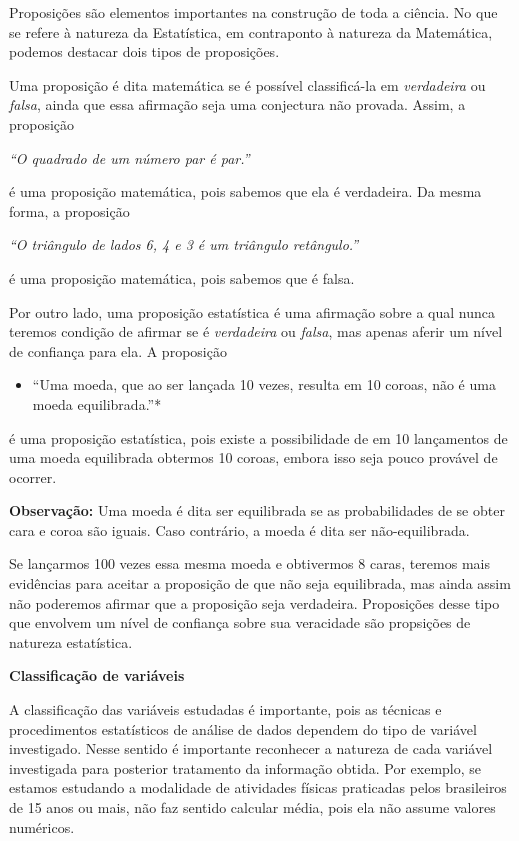 \begin{reflection}
Proposições são elementos importantes na construção de toda a ciência. No que se refere à natureza da Estatística, em contraponto à natureza da Matemática, podemos destacar dois tipos de proposições.

Uma proposição é dita matemática se é possível classificá-la em \emph{verdadeira} ou \emph{falsa}, ainda que essa afirmação seja uma conjectura não provada. Assim, a proposição

\emph{``O quadrado de um número par é par.''}

é uma proposição matemática, pois sabemos que ela é verdadeira. Da mesma forma, a proposição

\emph{``O triângulo de lados 6, 4 e 3 é um triângulo retângulo.''}

é uma proposição matemática, pois sabemos que é falsa.

Por outro lado, uma proposição estatística é uma afirmação sobre a qual nunca teremos condição de afirmar se é \emph{verdadeira} ou \emph{falsa}, mas apenas aferir um nível de confiança para ela. A proposição
\begin{itemize}
\item {} 
``Uma moeda, que ao ser lançada 10 vezes, resulta em 10 coroas, não é uma moeda equilibrada.''*

\end{itemize}

é uma proposição estatística, pois existe a possibilidade de em 10 lançamentos de uma moeda equilibrada obtermos 10 coroas, embora isso seja pouco provável de ocorrer.

\textbf{Observação:} Uma moeda é dita ser equilibrada se as probabilidades de se obter cara e coroa são iguais. Caso contrário, a moeda é dita ser não-equilibrada.

Se lançarmos 100 vezes essa mesma moeda e obtivermos 8 caras, teremos mais evidências para aceitar a proposição de que não seja equilibrada, mas ainda assim não poderemos afirmar que a proposição seja verdadeira. Proposições desse tipo que envolvem um nível de confiança sobre sua veracidade são propsições de natureza estatística.
\end{reflection}
\label{est1-class-1}
\textbf{Classificação de variáveis}

A classificação das variáveis estudadas é importante, pois as técnicas e procedimentos estatísticos de análise de dados dependem do tipo de variável investigado. Nesse sentido é importante reconhecer a natureza de cada variável investigada para posterior tratamento da informação obtida. Por exemplo, se estamos estudando a modalidade de atividades físicas praticadas pelos brasileiros de 15 anos ou mais, não faz sentido calcular média, pois  ela não assume valores numéricos.

